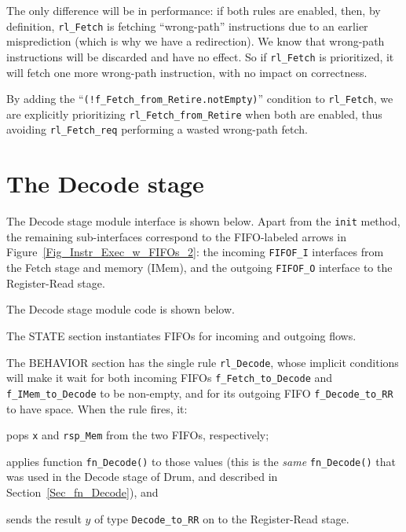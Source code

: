 The only difference will be in performance: if both rules are enabled,
then, by definition, \verb|rl_Fetch| is fetching ``wrong-path''
instructions due to an earlier misprediction (which is why we have a
redirection).  We know that wrong-path instructions will be discarded
and have no effect.  So if \verb|rl_Fetch| is prioritized, it will
fetch one more wrong-path instruction, with no impact on correctness.

By adding the ``\verb|(!f_Fetch_from_Retire.notEmpty)|'' condition to
\verb|rl_Fetch|, we are explicitly prioritizing
\verb|rl_Fetch_from_Retire| when both are enabled, thus avoiding
\verb|rl_Fetch_req| performing a wasted wrong-path fetch.


\section{The Decode stage}

\label{Sec_Fife_Decode_stage}

The Decode stage module interface is shown below.  Apart from the
\verb|init| method, the remaining sub-interfaces correspond to the
FIFO-labeled arrows in Figure~\ref{Fig_Instr_Exec_w_FIFOs_2}: the
incoming \verb|FIFOF_I| interfaces from the Fetch stage and memory
(IMem), and the outgoing \verb|FIFOF_O| interface to the Register-Read
stage.


The Decode stage module code is shown below.


The STATE section instantiates FIFOs for incoming and outgoing flows.

The BEHAVIOR section has the single rule \verb|rl_Decode|, whose
implicit conditions will make it wait for both incoming FIFOs
\verb|f_Fetch_to_Decode| and \verb|f_IMem_to_Decode| to be non-empty,
and for its outgoing FIFO \verb|f_Decode_to_RR| to have space.  When
the rule fires, it:

\begin{tightlist}
 \item pops \verb|x| and \verb|rsp_Mem| from the two FIFOs, respectively;

 \item applies function \verb|fn_Decode()| to those values (this is
       the \emph{same} \verb|fn_Decode()| that was used in the Decode
       stage of Drum, and described in Section~\ref{Sec_fn_Decode}),
       and

 \item sends the result $y$ of type \verb|Decode_to_RR| on to the
       Register-Read stage.
\end{tightlist}

